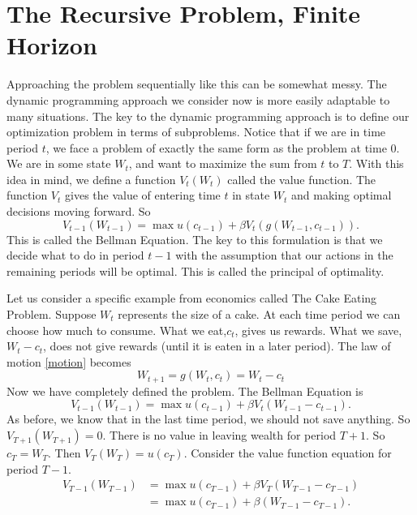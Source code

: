 \section*{The Recursive Problem, Finite Horizon}\label{SecRecProbFinHor}
Approaching the problem sequentially like this can be somewhat messy.  The dynamic programming approach we consider now is more easily adaptable to many situations.  The key to the dynamic programming approach is to define our optimization problem in terms of subproblems.  Notice that if we are in time period $t$, we face a problem of exactly the same form as the problem at time $0$.  We are in some state $W_t$, and want to maximize the sum from $t$ to $T$.  With this idea in mind, we define a function $V_t(W_t)$ called the value function.  The function $V_t$ gives the value of entering time $t$ in state $W_t$ and making optimal decisions moving forward.  So
\begin{equation}\label{value}
V_{t-1}(W_{t-1}) = \max u(c_{t-1}) + \beta V_t(g(W_{t-1},c_{t-1})).
\end{equation}
This is called the Bellman Equation.  The key to this formulation is that we decide what to do in period $t-1$ with the assumption that our actions in the remaining periods will be optimal.  This is called the principal of optimality.

Let us consider a specific example from economics called The Cake Eating Problem.  Suppose $W_t$ represents the size of a cake.  At each time period we can choose how much to consume.  What we eat,$c_t$, gives us rewards.  What we save,$W_t-c_t$, does not give rewards (until it is eaten in a later period).  The law of motion \eqref{motion} becomes
\begin{equation}\label{LOM_EX}
W_{t+1} = g(W_t,c_t) = W_t-c_t
\end{equation}
Now we have completely defined the problem.  The Bellman Equation is
\begin{equation}
V_{t-1}(W_{t-1}) = \max u(c_{t-1}) + \beta V_t(W_{t-1}-c_{t-1}).
\end{equation}
As before, we know that in the last time period, we should not save anything.  So $V_{T+1}(W_{T+1}) = 0$.  There is no value in leaving wealth for period $T+1$.  So $c_T = W_T$.  Then $V_T(W_T) = u(c_T)$.  Consider the value function equation for period $T-1$.
\begin{align}
V_{T-1}(W_{T-1}) &= \max u(c_{T-1}) + \beta V_T(W_{T-1}-c_{T-1}) \\
                 &= \max u(c_{T-1}) + \beta (W_{T-1}-c_{T-1}). \\
\end{align}

